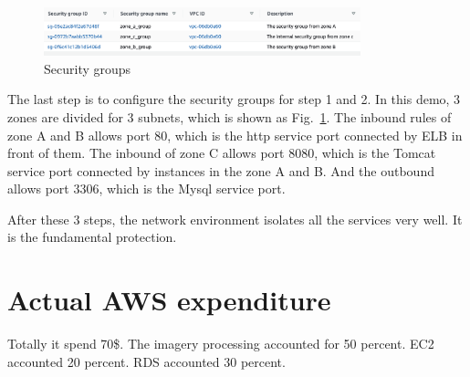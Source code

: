 \documentclass[conference]{IEEEtran}
\begin{document}
\begin{figure}[htbp]
    \centerline{\includegraphics[width=260pt]{images/security.png}}
    \caption{Security groups}
    \label{Security}
\end{figure}

The last step is to configure the security groups for step 1 and 2. In this demo, 3 zones are divided for 3 subnets, which is shown as Fig.~\ref{Security}. The inbound 
rules of zone A and B allows port 80, which is the http service port connected by ELB in front of them. The inbound of zone C allows port 8080, which is the Tomcat 
service port connected by instances in the zone A and B. And the outbound allows port 3306, which is the Mysql service port.

After these 3 steps, the network environment isolates all the services very well. It is the fundamental protection.

\section{Actual AWS expenditure}

Totally it spend 70\$. The imagery processing accounted for 50 percent. EC2 accounted 20 percent. RDS accounted 30 percent.
\end{document}
